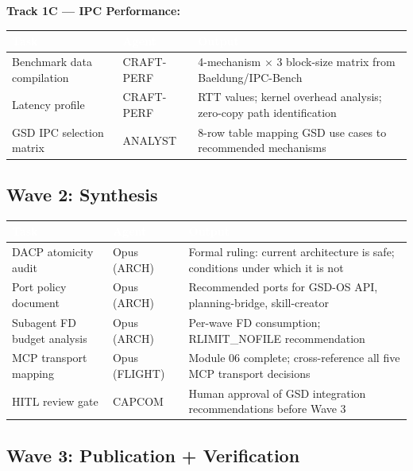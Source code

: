 \documentclass[11pt,letterpaper]{article}
\newcommand{\tableheader}[1]{\textbf{\sffamily\textcolor{white}{#1}}}
\begin{document}
\textbf{Track 1C --- IPC Performance:}

\begin{center}
\begin{tabularx}{\textwidth}{L{3cm}L{2cm}X}
\toprule
{}
\tableheader{Task} & \tableheader{Agent} & \tableheader{Output} \\
\midrule
Benchmark data compilation & CRAFT-PERF & 4-mechanism $\times$ 3 block-size matrix from Baeldung/IPC-Bench \\
Latency profile & CRAFT-PERF & RTT values; kernel overhead analysis; zero-copy path identification \\
GSD IPC selection matrix & ANALYST & 8-row table mapping GSD use cases to recommended mechanisms \\
\bottomrule
\end{tabularx}
\end{center}

\subsection{Wave 2: Synthesis}

\begin{center}
\begin{tabularx}{\textwidth}{L{3cm}L{2cm}X}
\toprule
{}
\tableheader{Task} & \tableheader{Agent} & \tableheader{Output} \\
\midrule
DACP atomicity audit & Opus (ARCH) & Formal ruling: current architecture is safe; conditions under which it is not \\
Port policy document & Opus (ARCH) & Recommended ports for GSD-OS API, planning-bridge, skill-creator \\
Subagent FD budget analysis & Opus (ARCH) & Per-wave FD consumption; RLIMIT\_NOFILE recommendation \\
MCP transport mapping & Opus (FLIGHT) & Module 06 complete; cross-reference all five MCP transport decisions \\
HITL review gate & CAPCOM & Human approval of GSD integration recommendations before Wave 3 \\
\bottomrule
\end{tabularx}
\end{center}

\subsection{Wave 3: Publication + Verification}
\end{document}
